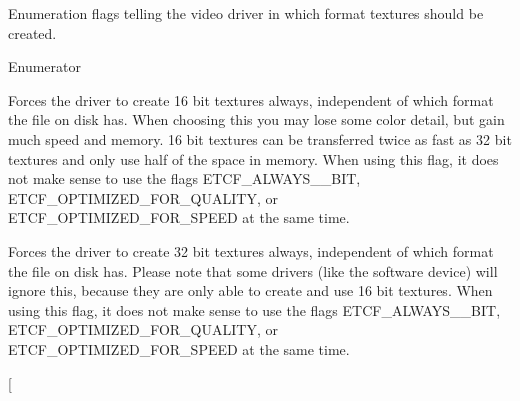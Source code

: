 Enumeration flags telling the video driver in which format textures should be created. 

\begin{Desc}
\item[Enumerator]\par
\begin{description}
\item[{\em 
E\+T\+C\+F\+\_\+\+A\+L\+W\+A\+Y\+S\+\_\+16\+\_\+\+B\+IT\hypertarget{namespaceirr_1_1video_acaf6f7414534f7d62bff18c5bf11876fa4fe1c1b0f4b44ef4b5da219ce66a0ae8}{}\label{namespaceirr_1_1video_acaf6f7414534f7d62bff18c5bf11876fa4fe1c1b0f4b44ef4b5da219ce66a0ae8}
}]Forces the driver to create 16 bit textures always, independent of which format the file on disk has. When choosing this you may lose some color detail, but gain much speed and memory. 16 bit textures can be transferred twice as fast as 32 bit textures and only use half of the space in memory. When using this flag, it does not make sense to use the flags E\+T\+C\+F\+\_\+\+A\+L\+W\+A\+Y\+S\+\_\+\_\+\+B\+IT, E\+T\+C\+F\+\_\+\+O\+P\+T\+I\+M\+I\+Z\+E\+D\+\_\+\+F\+O\+R\+\_\+\+Q\+U\+A\+L\+I\+TY, or E\+T\+C\+F\+\_\+\+O\+P\+T\+I\+M\+I\+Z\+E\+D\+\_\+\+F\+O\+R\+\_\+\+S\+P\+E\+ED at the same time. \item[{\em 
E\+T\+C\+F\+\_\+\+A\+L\+W\+A\+Y\+S\+\_\+32\+\_\+\+B\+IT\hypertarget{namespaceirr_1_1video_acaf6f7414534f7d62bff18c5bf11876fa20881e307a778c4a4fbb5327a60a93bb}{}\label{namespaceirr_1_1video_acaf6f7414534f7d62bff18c5bf11876fa20881e307a778c4a4fbb5327a60a93bb}
}]Forces the driver to create 32 bit textures always, independent of which format the file on disk has. Please note that some drivers (like the software device) will ignore this, because they are only able to create and use 16 bit textures. When using this flag, it does not make sense to use the flags E\+T\+C\+F\+\_\+\+A\+L\+W\+A\+Y\+S\+\_\+\_\+\+B\+IT, E\+T\+C\+F\+\_\+\+O\+P\+T\+I\+M\+I\+Z\+E\+D\+\_\+\+F\+O\+R\+\_\+\+Q\+U\+A\+L\+I\+TY, or E\+T\+C\+F\+\_\+\+O\+P\+T\+I\+M\+I\+Z\+E\+D\+\_\+\+F\+O\+R\+\_\+\+S\+P\+E\+ED at the same time. \item[{\em 
}
\end{description}
\end{Desc}
